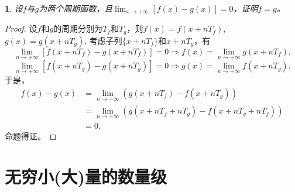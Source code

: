 \documentclass[utf8]{book}
\newtheorem{example}{}[section]             %
\begin{document}
\begin{example}
设$f$与$g$为两个周期函数，且$\displaystyle\lim_{x\to +\infty}[f(x)-g(x)]=0$，证明$f=g$。
\end{example}
\begin{proof}设$f$和$g$的周期分别为$T_f$和$T_g$，则$f(x) = f(x+nT_f)$, $g(x) = g(x+nT_g)$.
考虑子列$\{x+nT_f\}$和$x+nT_g$，有
$$\displaystyle\lim_{n\to +\infty}[f(x+nT_f)-g(x+nT_f)]=0\Rightarrow f(x)=\displaystyle\lim_{n\to +\infty}g(x+nT_f).$$ 
$$\displaystyle\lim_{n\to +\infty}[f(x+nT_g)-g(x+nT_g)]=0\Rightarrow g(x)=\displaystyle\lim_{n\to +\infty}f(x+nT_g).$$
于是，
\begin{equation*}
\begin{split}
f(x)-g(x)&=\displaystyle\lim_{n\to +\infty}(g(x+nT_f)-f(x+nT_g))\\&=\displaystyle\lim_{n\to +\infty}(g(x+nT_f+nT_g)-f(x+nT_g+nT_f))\\&= 0.
\end{split}
\end{equation*}
命题得证。
\end{proof}
\section{无穷小(大)量的数量级}
\end{document}

